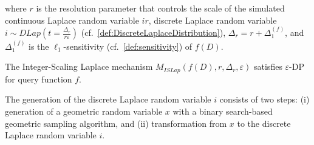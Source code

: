where $r$ is the resolution parameter that controls the scale of the simulated continuous Laplace random variable $ir$, discrete Laplace random variable $i \sim DLap\left(t=\frac{\Delta_r}{r\varepsilon}\right) $ (cf.~\autoref{def:DiscreteLaplaceDistribution}), $\Delta _r=r+\Delta^{\left(f\right) }_1$, and $\Delta^{\left(f\right) }_1$ is the $\ell_1$-sensitivity (cf.~\autoref{def:sensitivity}) of $f\left(D\right)$.

\begin{theorem}
    The Integer-Scaling Laplace mechanism $M_{ISLap}\left(f\left(D\right),r,\Delta _r,\varepsilon\right)$ satisfies $\varepsilon$-DP for query function $f$.
\end{theorem}

The generation of the discrete Laplace random variable $i$ consists of two steps: (i) generation of a geometric random variable $x$ with a binary search-based geometric sampling algorithm, and (ii) transformation from $x$ to the discrete Laplace random variable $i$.





